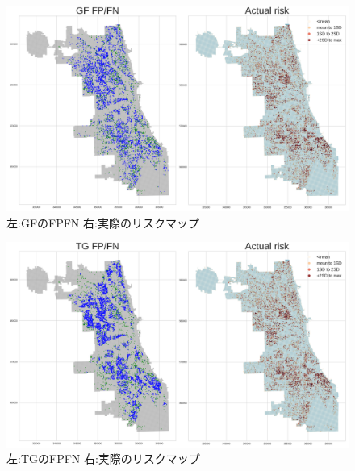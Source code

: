 \begin{figure}
  \centering %
  \includegraphics[scale=0.25]{./non-crime-timeseries-fig/GF_fnp.png}
  \caption{左:GFのFPFN 右:実際のリスクマップ}
  \label{fig:non-crime-timeseries-gf-fnp}
\end{figure}

\begin{figure}
  \centering %
  \includegraphics[scale=0.25]{./non-crime-timeseries-fig/TG_fnp.png}
  \caption{左:TGのFPFN 右:実際のリスクマップ}
  \label{fig:non-crime-timeseries-tg-fnp}
\end{figure}

